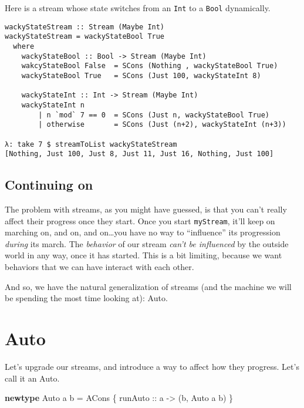 \documentclass[]{article}
\newenvironment{Shaded}{}{}
\newcommand{\KeywordTok}[1]{\textcolor[rgb]{0.00,0.44,0.13}{\textbf{{#1}}}}
\newcommand{\DataTypeTok}[1]{\textcolor[rgb]{0.56,0.13,0.00}{{#1}}}
\newcommand{\OtherTok}[1]{\textcolor[rgb]{0.00,0.44,0.13}{{#1}}}
\newcommand{\FunctionTok}[1]{\textcolor[rgb]{0.02,0.16,0.49}{{#1}}}
\newcommand{\NormalTok}[1]{{#1}}
\begin{document}
Here is a stream whose state switches from an \texttt{Int} to a
\texttt{Bool} dynamically.

\begin{verbatim}
wackyStateStream :: Stream (Maybe Int)
wackyStateStream = wackyStateBool True
  where
    wackyStateBool :: Bool -> Stream (Maybe Int)
    wakcyStateBool False  = SCons (Nothing , wackyStateBool True)
    wackyStateBool True   = SCons (Just 100, wackyStateInt 8)

    wackyStateInt :: Int -> Stream (Maybe Int)
    wackyStateInt n
        | n `mod` 7 == 0  = SCons (Just n, wackyStateBool True)
        | otherwise       = SCons (Just (n+2), wackyStateInt (n+3))

λ: take 7 $ streamToList wackyStateStream
[Nothing, Just 100, Just 8, Just 11, Just 16, Nothing, Just 100]
\end{verbatim}

\subsection{Continuing on}\label{continuing-on}

The problem with streams, as you might have guessed, is that you can't
really affect their progress once they start. Once you start
\texttt{myStream}, it'll keep on marching on, and on, and on\ldots{}you
have no way to ``influence'' its progression \emph{during} its march.
The \emph{behavior} of our stream \emph{can't be influenced} by the
outside world in any way, once it has started. This is a bit limiting,
because we want behaviors that we can have interact with each other.

And so, we have the natural generalization of streams (and the machine
we will be spending the most time looking at): Auto.

\section{Auto}\label{auto}

Let's upgrade our streams, and introduce a way to affect how they
progress. Let's call it an Auto.

\begin{Shaded}
\begin{Highlighting}[]
\KeywordTok{newtype} \DataTypeTok{Auto} \NormalTok{a b }\FunctionTok{=} \DataTypeTok{ACons} \NormalTok{\{}\OtherTok{ runAuto ::} \NormalTok{a }\OtherTok{->} \NormalTok{(b, }\DataTypeTok{Auto} \NormalTok{a b) \}}
\end{Highlighting}
\end{Shaded}
\end{document}
